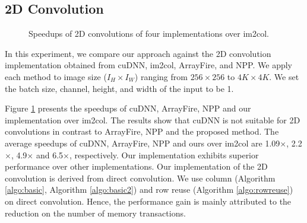 \subsection{2D Convolution\label{sec:ex2dc}}
\begin{figure}
\centering
{}
\hspace{0em}
	
\caption{Speedups of 2D convolutions of four implementations over im2col.}
\label{fig:2druntime}
\end{figure}



In this experiment, we compare our approach against the 2D convolution implementation obtained from cuDNN, im2col,  ArrayFire, and NPP. We
apply each method to image size ($I_H \times I_W$) ranging from $256 \times 256$ to $4K \times 4K$. We set the batch size, channel, height,
and width of the input to be 1.




Figure \ref{fig:2druntime} presents the speedups of cuDNN, ArrayFire, NPP and our implementation over im2col. The results show that cuDNN is not suitable for 2D convolutions in contrast to ArrayFire, NPP and the proposed method. The average speedups of cuDNN, ArrayFire, NPP and ours over im2col are 1.09$\times$, 2.2$\times$, 4.9$\times$ and 6.5$\times$, respectively. Our implementation exhibits superior performance over other implementations. Our implementation of the 2D convolution is derived from direct convolution. We use column (Algorithm \ref{algo:basic}, Algorithm \ref{algo:basic2}) and row reuse (Algorithm \ref{algo:rowreuse}) on direct convolution. Hence, the performance gain is mainly attributed to the reduction on the number of memory transactions.

